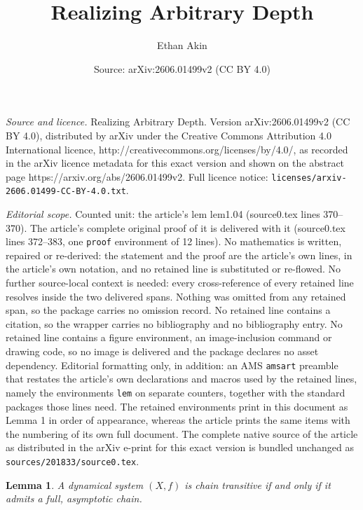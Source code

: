 \documentclass[10pt,a4paper]{amsart}
\title{Realizing Arbitrary Depth}
\author{Ethan Akin}
\date{Source: arXiv:2606.01499v2 (CC BY 4.0)}
\newtheorem{lem}{Lemma}
\begin{document}
\maketitle

\noindent\emph{Source and licence.} Realizing Arbitrary Depth. Version arXiv:2606.01499v2 (CC BY 4.0), distributed by arXiv under the Creative Commons Attribution 4.0 International licence, http://creativecommons.org/licenses/by/4.0/, as recorded in the arXiv licence metadata for this exact version and shown on the abstract page https://arxiv.org/abs/2606.01499v2. Full licence notice: \texttt{licenses/arxiv-2606.01499-CC-BY-4.0.txt}.\par\smallskip

\noindent\textit{Editorial scope.} Counted unit: the article's lem lem1.04 (source0.tex lines 370--370). The article's complete original proof of it is delivered with it (source0.tex lines 372--383, one \texttt{proof} environment of 12 lines). No mathematics is written, repaired or re-derived: the statement and the proof are the article's own lines, in the article's own notation, and no retained line is substituted or re-flowed.  No further source-local context is needed: every cross-reference of every retained line resolves inside the two delivered spans.  Nothing was omitted from any retained span, so the package carries no omission record.  No retained line contains a citation, so the wrapper carries no bibliography and no bibliography entry.  No retained line contains a figure environment, an image-inclusion command or drawing code, so no image is delivered and the package declares no asset dependency.  Editorial formatting only, in addition: an AMS \texttt{amsart} preamble that restates the article's own declarations and macros used by the retained lines, namely the environments \texttt{lem} on separate counters, together with the standard packages those lines need.  The retained environments print in this document as Lemma 1 in order of appearance, whereas the article prints the same items with the numbering of its own full document.  The complete native source of the article as distributed in the arXiv e-print for this exact version is bundled unchanged as \texttt{sources/201833/source0.tex}.
\begin{lem}\label{lem1.04} A dynamical system $(X,f)$ is chain transitive if and only if it admits a full, asymptotic chain. \end{lem}
\end{document}
